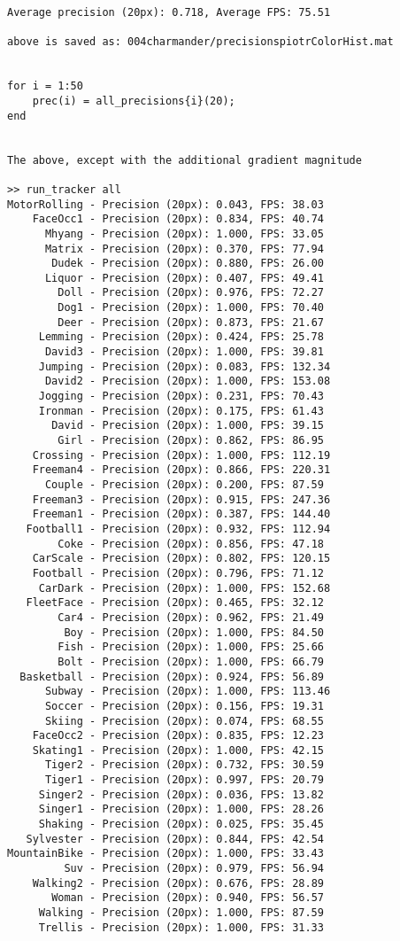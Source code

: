 \begin{lstlisting}
Average precision (20px): 0.718, Average FPS: 75.51

above is saved as: 004charmander/precisionspiotrColorHist.mat


for i = 1:50
    prec(i) = all_precisions{i}(20);
end


The above, except with the additional gradient magnitude

>> run_tracker all
MotorRolling - Precision (20px): 0.043, FPS: 38.03
    FaceOcc1 - Precision (20px): 0.834, FPS: 40.74
      Mhyang - Precision (20px): 1.000, FPS: 33.05
      Matrix - Precision (20px): 0.370, FPS: 77.94
       Dudek - Precision (20px): 0.880, FPS: 26.00
      Liquor - Precision (20px): 0.407, FPS: 49.41
        Doll - Precision (20px): 0.976, FPS: 72.27
        Dog1 - Precision (20px): 1.000, FPS: 70.40
        Deer - Precision (20px): 0.873, FPS: 21.67
     Lemming - Precision (20px): 0.424, FPS: 25.78
      David3 - Precision (20px): 1.000, FPS: 39.81
     Jumping - Precision (20px): 0.083, FPS: 132.34
      David2 - Precision (20px): 1.000, FPS: 153.08
     Jogging - Precision (20px): 0.231, FPS: 70.43
     Ironman - Precision (20px): 0.175, FPS: 61.43
       David - Precision (20px): 1.000, FPS: 39.15
        Girl - Precision (20px): 0.862, FPS: 86.95
    Crossing - Precision (20px): 1.000, FPS: 112.19
    Freeman4 - Precision (20px): 0.866, FPS: 220.31
      Couple - Precision (20px): 0.200, FPS: 87.59
    Freeman3 - Precision (20px): 0.915, FPS: 247.36
    Freeman1 - Precision (20px): 0.387, FPS: 144.40
   Football1 - Precision (20px): 0.932, FPS: 112.94
        Coke - Precision (20px): 0.856, FPS: 47.18
    CarScale - Precision (20px): 0.802, FPS: 120.15
    Football - Precision (20px): 0.796, FPS: 71.12
     CarDark - Precision (20px): 1.000, FPS: 152.68
   FleetFace - Precision (20px): 0.465, FPS: 32.12
        Car4 - Precision (20px): 0.962, FPS: 21.49
         Boy - Precision (20px): 1.000, FPS: 84.50
        Fish - Precision (20px): 1.000, FPS: 25.66
        Bolt - Precision (20px): 1.000, FPS: 66.79
  Basketball - Precision (20px): 0.924, FPS: 56.89
      Subway - Precision (20px): 1.000, FPS: 113.46
      Soccer - Precision (20px): 0.156, FPS: 19.31
      Skiing - Precision (20px): 0.074, FPS: 68.55
    FaceOcc2 - Precision (20px): 0.835, FPS: 12.23
    Skating1 - Precision (20px): 1.000, FPS: 42.15
      Tiger2 - Precision (20px): 0.732, FPS: 30.59
      Tiger1 - Precision (20px): 0.997, FPS: 20.79
     Singer2 - Precision (20px): 0.036, FPS: 13.82
     Singer1 - Precision (20px): 1.000, FPS: 28.26
     Shaking - Precision (20px): 0.025, FPS: 35.45
   Sylvester - Precision (20px): 0.844, FPS: 42.54
MountainBike - Precision (20px): 1.000, FPS: 33.43
         Suv - Precision (20px): 0.979, FPS: 56.94
    Walking2 - Precision (20px): 0.676, FPS: 28.89
       Woman - Precision (20px): 0.940, FPS: 56.57
     Walking - Precision (20px): 1.000, FPS: 87.59
     Trellis - Precision (20px): 1.000, FPS: 31.33


\end{lstlisting}
